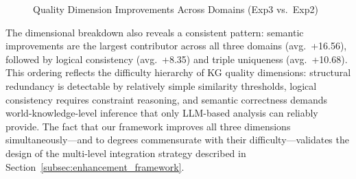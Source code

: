 \documentclass[runningheads]{llncs}
\begin{document}
\begin{figure}[H]
    \centering
    \caption{Quality Dimension Improvements Across Domains (Exp3 vs.\ Exp2)}
    \label{fig:dimension_improvement}
\end{figure}

The dimensional breakdown also reveals a consistent pattern: semantic improvements are the largest contributor across all three domains (avg.\ +16.56), followed by logical consistency (avg.\ +8.35) and triple uniqueness (avg.\ +10.68). This ordering reflects the difficulty hierarchy of KG quality dimensions: structural redundancy is detectable by relatively simple similarity thresholds, logical consistency requires constraint reasoning, and semantic correctness demands world-knowledge-level inference that only LLM-based analysis can reliably provide. The fact that our framework improves all three dimensions simultaneously—and to degrees commensurate with their difficulty—validates the design of the multi-level integration strategy described in Section~\ref{subsec:enhancement_framework}.
\end{document}
